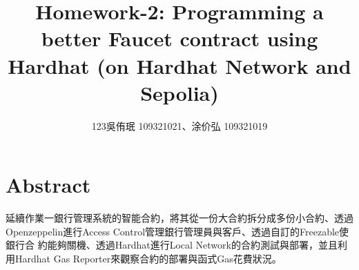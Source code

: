 \documentclass[12pt,a4paper]{article}
\title{Homework-2: Programming a better Faucet contract using Hardhat (on
Hardhat Network and Sepolia)}
\author{123吳侑珉 109321021、涂价弘 109321019}
\begin{document}
 \date{} \maketitle

\tableofcontents

\pagebreak

\section{Abstract}

延續作業一銀行管理系統的智能合約，將其從一份大合約拆分成多份小合約、透過
Openzeppelin\cite{openzeppelin}進行Access Control管理銀行管理員與客戶、透過自訂的Freezable使銀行合
約能夠關機、透過Hardhat\cite{hardhat}進行Local Network的合約測試與部署，並且利用Hardhat Gas
Reporter\cite{hardhat-gas-reporter}來觀察合約的部署與函式Gas花費狀況。






\pagebreak
\printbibliography
\end{document}
